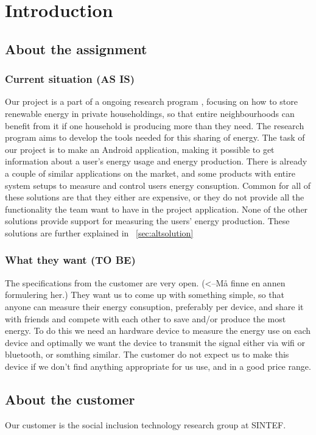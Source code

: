 \chapter{Introduction}

\section{About the assignment}
\subsection{Current situation (AS IS)}
Our project is a part of a ongoing research program \cite{cossmic}, focusing on how to store renewable energy in private householdings, so that entire neighbourhoods can benefit from it if one household is producing more than they need. The research program aims to develop the tools needed for this sharing of energy. The task of our project is to make an Android application, making it possible to get information about a user's energy usage and energy production. There is already a couple of similar applications on the market, and some products with entire system setups to measure and control users energy consuption. Common for all of these solutions are that they either are expensive, or they do not provide all the functionality the team want to have in the project application. None of the other solutions provide support for measuring the users' energy production. These solutions are further explained in ~\ref{sec:altsolution}

\subsection{What they want (TO BE)}
The specifications from the customer are very open. (<--Må finne en annen formulering her.) They want us to come up with something simple, so that anyone can measure their energy consuption, preferably per device, and share it with friends and compete with each other to save and/or produce the most energy. To do this we need an hardware device to measure the energy use on each device and optimally we want the device to transmit the signal either via wifi or bluetooth, or somthing similar. The customer do not expect us to make this device if we don’t find anything appropriate for us use, and in a good price range.

\section{About the customer}

Our customer is the social inclusion technology research group at SINTEF. \cite{sintef}








 


